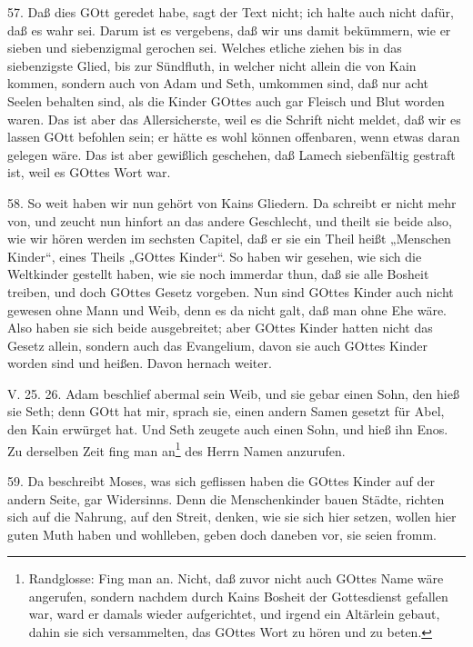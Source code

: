 57. Daß dies GOtt geredet habe, sagt der Text nicht; ich halte auch nicht dafür, daß es wahr sei. Darum ist es vergebens, daß wir uns damit bekümmern, wie er sieben und siebenzigmal gerochen sei. Welches etliche ziehen bis in das siebenzigste Glied, bis zur Sündfluth, in welcher nicht allein die von Kain kommen, sondern auch von Adam und Seth, umkommen sind, daß nur acht Seelen behalten sind, als die Kinder GOttes auch gar Fleisch und Blut worden waren. Das ist aber das Allersicherste, weil es die Schrift nicht meldet, daß wir es lassen GOtt befohlen sein; er hätte es wohl können offenbaren, wenn etwas daran gelegen wäre. Das ist aber gewißlich geschehen, daß Lamech siebenfältig gestraft ist, weil es GOttes Wort war.

58. So weit haben wir nun gehört von Kains Gliedern. Da schreibt er nicht mehr von, und zeucht nun hinfort an das andere Geschlecht, und theilt sie beide also, wie wir hören werden im sechsten Capitel, daß er sie ein Theil heißt „Menschen Kinder“, eines Theils „GOttes Kinder“. So haben wir gesehen, wie sich die Weltkinder gestellt haben, wie sie noch immerdar thun, daß sie alle Bosheit treiben, und doch GOttes Gesetz vorgeben. Nun sind GOttes Kinder auch nicht
gewesen ohne Mann und Weib, denn es da nicht galt, daß man ohne Ehe wäre. Also haben sie sich beide ausgebreitet; aber GOttes Kinder hatten nicht das Gesetz allein, sondern auch das Evangelium, davon sie auch GOttes Kinder worden sind und heißen. Davon hernach weiter.

\begin{schriftzitat}
V. 25. 26. Adam beschlief abermal sein Weib, und sie gebar einen Sohn, den hieß sie Seth; denn GOtt hat mir, sprach sie, einen andern Samen gesetzt für Abel, den Kain erwürget hat. Und Seth zeugete auch einen Sohn, und hieß ihn Enos. Zu derselben Zeit fing man an\footnote{Randglosse: Fing man an. Nicht, daß zuvor nicht auch GOttes Name wäre angerufen, sondern nachdem durch Kains Bosheit der Gottesdienst gefallen war, ward er damals wieder aufgerichtet, und irgend ein Altärlein gebaut, dahin sie sich versammelten, das GOttes Wort zu hören und zu beten.} des Herrn Namen anzurufen.
\end{schriftzitat}

59. Da beschreibt Moses, was sich geflissen haben die GOttes Kinder auf der andern Seite, gar Widersinns. Denn die Menschenkinder bauen Städte, richten sich auf die Nahrung, auf den Streit, denken, wie sie sich hier setzen, wollen hier guten Muth haben und wohlleben, geben doch daneben vor, sie seien fromm.

